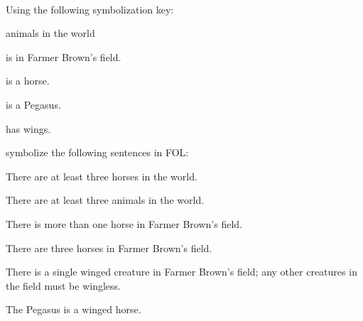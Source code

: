 \begin{practiceproblems}
\begin{problemslist}
\end{problemslist}

\

\problempart Using the following symbolization key:
\begin{ekey}
\item[\text{domain}] animals in the world
\item[\atom{B}{x}]  is in Farmer Brown's field.
\item[\atom{H}{x}]  is a horse.
\item[\atom{P}{x}]  is a Pegasus.
\item[\atom{W}{x}]  has wings.
\end{ekey}
symbolize the following sentences in FOL:
\begin{problemslist}
\item There are at least three horses in the world.
\item[] 
\item There are at least three animals in the world.
\item[] 
\item There is more than one horse in Farmer Brown's field.
\item[] 
\item There are three horses in Farmer Brown's field.
\item[] 
\item There is a single winged creature in Farmer Brown's field; any other creatures in the field must be wingless.
\item[] 
\item The Pegasus is a winged horse.
\item[] 

\end{problemslist}
\end{practiceproblems}
